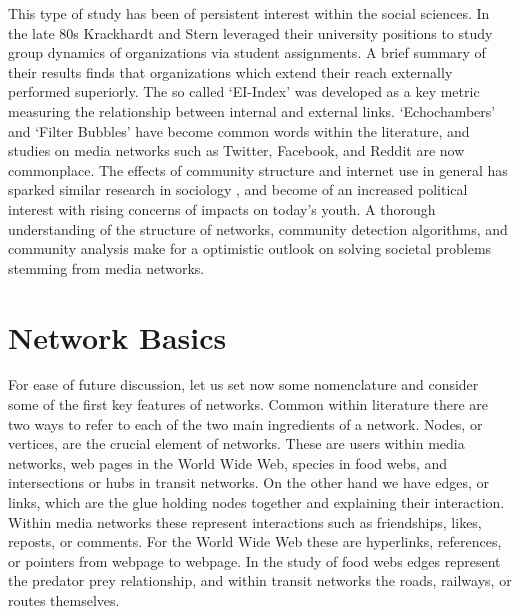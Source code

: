 \documentclass[a4paper, 10pt, twocolumn]{article}
\begin{document}
This type of study has been of persistent interest within the social sciences. 
In the late 80s Krackhardt and Stern \cite{inet_crises} leveraged their university positions to study group dynamics of organizations via student assignments. 
A brief summary of their results finds that organizations which extend their reach externally performed superiorly. 
The so called `EI-Index' was developed as a key metric measuring the relationship between internal and external links. 
`Echochambers' and `Filter Bubbles' have become common words within the literature, and studies on media networks such as Twitter, Facebook, and Reddit \cite{eko_weko, sm_ece, ekoin_ekobtwin} are now commonplace. 
The effects of community structure and internet use in general has sparked similar research in sociology \cite{antisocial, eko_and_episteme, conspiracies_online, captivating}, and become of an increased political interest with rising concerns of impacts on today's youth. 
A thorough understanding of the structure of networks, community detection algorithms, and community analysis make for a optimistic outlook on solving societal problems stemming from media networks.


\section{Network Basics}

For ease of future discussion, let us set now some nomenclature and consider some of the first key features of networks. 
Common within literature there are two ways to refer to each of the two main ingredients of a network. 
Nodes, or vertices, are the crucial element of networks. 
These are users within media networks, web pages in the World Wide Web, species in food webs, and intersections or hubs in transit networks. 
On the other hand we have edges, or links, which are the glue holding nodes together and explaining their interaction. 
Within media networks these represent interactions such as friendships, likes, reposts, or comments. 
For the World Wide Web these are hyperlinks, references, or pointers from webpage to webpage.
In the study of food webs edges represent the predator prey relationship, and within transit networks the roads, railways, or routes themselves. 
\end{document}
